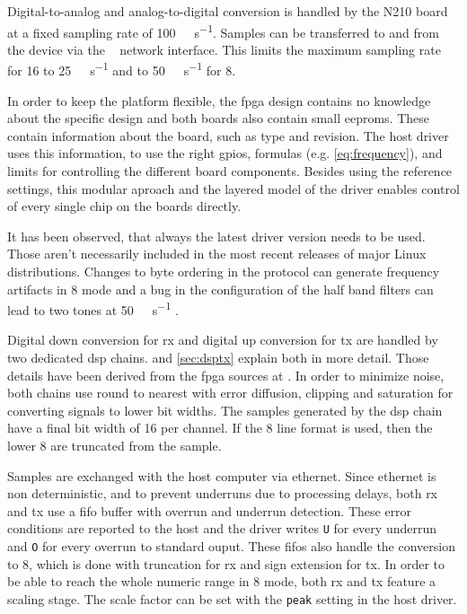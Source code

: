 \documentclass[12pt,a4paper,parskip=full,abstracton]{scrartcl}
\begin{document}
Digital-to-analog and analog-to-digital conversion is handled by the N210 board at a fixed sampling rate of
\SI{100}{\mega\samples\per\second}. Samples can be transferred to and from the device via the
\si{\giga\bit} network interface. This limits the maximum sampling rate for \SI{16}{\bit} to
\SI{25}{\mega\samples\per\second} and to \SI{50}{\mega\samples\per\second} for \SI{8}{\bit}.

In order to keep the platform flexible, the \gls{fpga} design contains no knowledge
about the specific design and both boards also contain small \glspl{eeprom}. These contain
information about the board, such as type and revision. The host driver uses this information,
to use the right \glspl{gpio}, formulas (e.g. \cref{eq:frequency}), and limits for controlling
the different board components. Besides using the reference settings, this modular aproach
and the layered model of the driver enables control of every single chip on the boards directly.

It has been observed, that always the latest driver version needs to be used. Those aren't
necessarily included in the most recent releases of major Linux distributions. Changes to
byte ordering in the protocol \cite{usrp_byte} can
generate frequency artifacts in \SI{8}{\bit} mode and a bug in the configuration of the half
band filters can lead to two tones at \SI{50}{\mega\samples\per\second} \cite{usrp_hb}.

Digital down conversion for \gls{rx} and digital up conversion for \gls{tx} are handled
by two dedicated \gls{dsp} chains.
 and \cref{sec:dsptx} explain both in more detail. Those details have been derived
from the \gls{fpga} sources at \cite{usrp_src}.
In order to minimize noise, both chains use round to nearest with error diffusion, clipping and saturation
for converting signals to lower bit widths. The samples generated by the \gls{dsp} chain have a final
bit width of \SI{16}{\bit} per channel. If the \SI{8}{\bit} line format is used, then the
lower \SI{8}{\bit} are truncated from the sample.

Samples are exchanged with the host computer via ethernet. Since ethernet is non deterministic, and to prevent underruns due to processing delays, 
both \gls{rx} and \gls{tx} use a \gls{fifo} buffer with overrun and underrun detection. These
error conditions are reported to the host and the driver writes \texttt{U} for every underrun
and \texttt{O} for every overrun to standard ouput. These \glspl{fifo} also handle the
conversion to \SI{8}{\bit}, which is done with truncation for \gls{rx} and sign extension for
\gls{tx}. In order to be able to reach the whole numeric range in \SI{8}{\bit} mode, both
\gls{rx} and \gls{tx} feature a scaling stage. The scale factor can be set with the
\texttt{peak} setting in the host driver.
\end{document}
